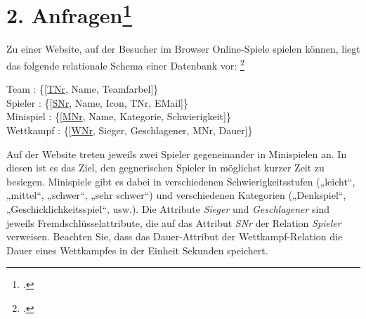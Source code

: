 \documentclass{lehramt-informatik}
\begin{document}
%

\section{2. Anfragen\footcite{db:ab:examen-rs-2013-03}}

Zu einer Website, auf der Besucher im Browser Online-Spiele spielen
können, liegt das folgende relationale Schema einer Datenbank vor:
\footcite{examen:46116:2013:03}

\bigskip

{
\ttfamily
\noindent
Team : \{[\underline{TNr}, Name, Teamfarbel]\}\\
Spieler : \{[\underline{SNr}, Name, Icon, TNr, EMail]\}\\
Minispiel : \{[\underline{MNr}, Name, Kategorie, Schwierigkeit]\}\\
Wettkampf : \{[\underline{WNr}, Sieger, Geschlagener, MNr, Dauer]\}\\
}

\bigskip

Auf der Website treten jeweils zwei Spieler gegeneinander in Minispielen
an. In diesen ist es das Ziel, den gegnerischen Spieler in möglichst
kurzer Zeit zu besiegen. Minispiele gibt es dabei in verschiedenen
Schwierigkeitsstufen („leicht“, „mittel“, „schwer“, „sehr schwer“) und
verschiedenen Kategorien („Denkspiel“, „Geschicklichkeitsspiel“, usw.).
Die Attribute \emph{Sieger} und \emph{Geschlagener} sind jeweils
Fremdschlüsselattribute, die auf das Attribut \emph{SNr} der Relation
\emph{Spieler} verweisen. Beachten Sie, dass das Dauer-Attribut der
Wettkampf-Relation die Dauer eines Wettkampfes in der Einheit Sekunden
speichert.

\renewcommand{\labelenumi}{\alph{enumi})}
\renewcommand{\labelenumii}{\roman{enumii})}
\end{document}
